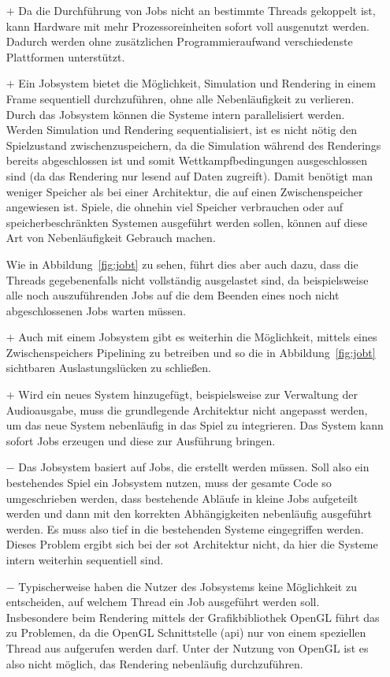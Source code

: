 \begin{itemize}
	\item[$+$]  Da die Durchführung von Jobs nicht an bestimmte Threads gekoppelt ist, kann Hardware mit mehr Prozessoreinheiten sofort voll ausgenutzt werden. Dadurch werden ohne zusätzlichen Programmieraufwand verschiedenste Plattformen unterstützt.
	\item[$+$] Ein Jobsystem bietet die Möglichkeit, Simulation und Rendering in einem Frame sequentiell durchzuführen, ohne alle Nebenläufigkeit zu verlieren. Durch das Jobsystem können die Systeme intern parallelisiert werden. Werden Simulation und Rendering sequentialisiert, ist es nicht nötig den Spielzustand zwischenzuspeichern, da die Simulation während des Renderings bereits abgeschlossen ist und somit Wettkampfbedingungen ausgeschlossen sind (da das Rendering nur lesend auf Daten zugreift). Damit benötigt man weniger Speicher als bei einer Architektur, die auf einen Zwischenspeicher angewiesen ist. Spiele, die ohnehin viel Speicher verbrauchen oder auf speicherbeschränkten Systemen ausgeführt werden sollen, können auf diese Art von Nebenläufigkeit Gebrauch machen. 
	
	Wie in Abbildung~\ref{fig:jobt} zu sehen, führt dies aber auch dazu, dass die Threads gegebenenfalls nicht vollständig ausgelastet sind, da beispielsweise alle noch auszuführenden Jobs auf die dem Beenden eines noch nicht abgeschlossenen Jobs warten müssen.
	\item[$+$] Auch mit einem Jobsystem gibt es weiterhin die Möglichkeit, mittels eines Zwischenspeichers Pipelining zu betreiben und so die in Abbildung~\ref{fig:jobt} sichtbaren Auslastungslücken zu schließen.
	\item[$+$] Wird ein neues System hinzugefügt, beispielsweise zur Verwaltung der Audioausgabe, muss die grundlegende Architektur nicht angepasst werden, um das neue System nebenläufig in das Spiel zu integrieren. Das System kann sofort Jobs erzeugen und diese zur Ausführung bringen.
	\item[$-$] Das Jobsystem basiert auf Jobs, die erstellt werden müssen. Soll also ein bestehendes Spiel ein Jobsystem nutzen, muss der gesamte Code so umgeschrieben werden, dass bestehende Abläufe in kleine Jobs aufgeteilt werden und dann mit den korrekten Abhängigkeiten nebenläufig ausgeführt werden. Es muss also tief in die bestehenden Systeme eingegriffen werden. Dieses Problem ergibt sich bei der \ac{sot} Architektur nicht, da hier die Systeme intern weiterhin sequentiell sind.
	\item[$-$] Typischerweise haben die Nutzer des Jobsystems keine Möglichkeit zu entscheiden, auf welchem Thread ein Job ausgeführt werden soll. Insbesondere beim Rendering mittels der Grafikbibliothek OpenGL führt das zu Problemen, da die OpenGL Schnittstelle (\acs{api}) nur von einem speziellen Thread aus aufgerufen werden darf. Unter der Nutzung von OpenGL ist es also nicht möglich, das Rendering nebenläufig durchzuführen.
\end{itemize}

